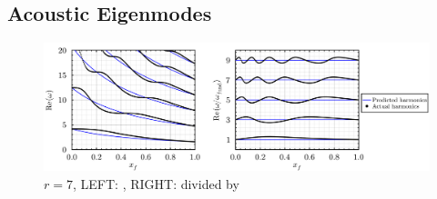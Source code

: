 


\subsection{Acoustic Eigenmodes}


\begin{figure}[t]
\centering
\includegraphics[scale=0.35]{assets/graphs/r=7_harmonics_both.pdf}
\caption{$r = 7$, LEFT: , RIGHT: divided by }
\label{fig:flame-harmonics}
\end{figure}

